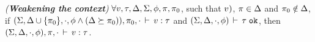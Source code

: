 \begin{lemma}
\emph{(\textbf{Weakening the context})}
\label{thm:fb-tywf}
$\forall v, \tau, \Delta, \Sigma, \phi, \pi, \pi_0$, such that $\value(v)$, $\pi
\in \Delta$ and $\pi_0 \notin \Delta$, if $(\Sigma, \Delta \cup
\{\pi_0\}, \cdot, \phi \wedge (\Delta \succeq \pi_0)),\pi_0,\cdot\,\vdash\,v:\tau$
and $(\Sigma, \Delta, \cdot, \phi)\,\vdash\,\tau \; \texttt{ok}$, then $(\Sigma,
\Delta, \cdot, \phi),\pi,\cdot\,\vdash\,v:\tau$.
\end{lemma}
\nobreak
